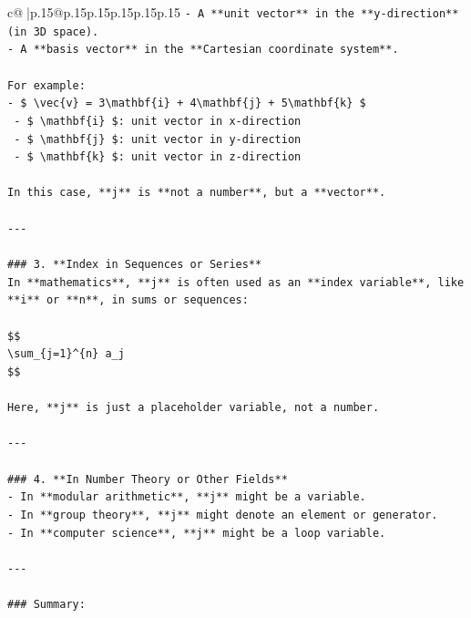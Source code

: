 \documentclass{article}
\begin{document}
{\begin{supertabular}{c@{$\;$}|p{.15\linewidth}@{}p{.15\linewidth}p{.15\linewidth}p{.15\linewidth}p{.15\linewidth}p{.15\linewidth}}
{{{\texttt{{-} A **unit vector** in the **y{-}direction** (in 3D space).} \\
\texttt{{-} A **basis vector** in the **Cartesian coordinate system**.} \\
\\ 
\texttt{For example:} \\
\texttt{{-} \$ \textbackslash{}vec\{v\} = 3\textbackslash{}mathbf\{i\} + 4\textbackslash{}mathbf\{j\} + 5\textbackslash{}mathbf\{k\} \$} \\
\texttt{  {-} \$ \textbackslash{}mathbf\{i\} \$: unit vector in x{-}direction} \\
\texttt{  {-} \$ \textbackslash{}mathbf\{j\} \$: unit vector in y{-}direction} \\
\texttt{  {-} \$ \textbackslash{}mathbf\{k\} \$: unit vector in z{-}direction} \\
\\ 
\texttt{In this case, **j** is **not a number**, but a **vector**.} \\
\\ 
\texttt{{-}{-}{-}} \\
\\ 
\texttt{\#\#\# 3. **Index in Sequences or Series**} \\
\texttt{In **mathematics**, **j** is often used as an **index variable**, like **i** or **n**, in sums or sequences:} \\
\\ 
\texttt{\$\$} \\
\texttt{\textbackslash{}sum\_\{j=1\}\^{}\{n\} a\_j} \\
\texttt{\$\$} \\
\\ 
\texttt{Here, **j** is just a placeholder variable, not a number.} \\
\\ 
\texttt{{-}{-}{-}} \\
\\ 
\texttt{\#\#\# 4. **In Number Theory or Other Fields**} \\
\texttt{{-} In **modular arithmetic**, **j** might be a variable.} \\
\texttt{{-} In **group theory**, **j** might denote an element or generator.} \\
\texttt{{-} In **computer science**, **j** might be a loop variable.} \\
\\ 
\texttt{{-}{-}{-}} \\
\\ 
\texttt{\#\#\# Summary:} \\
}}}
\end{supertabular}}
\end{document}
